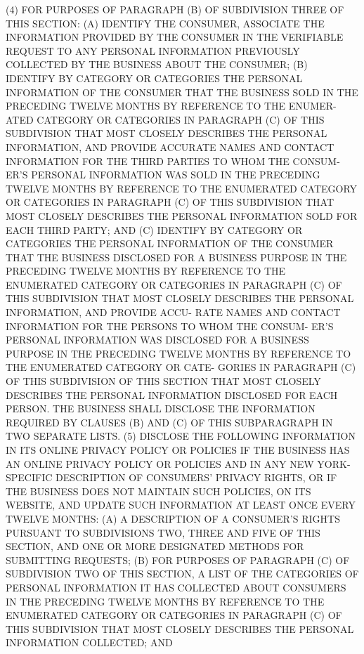    (4) FOR PURPOSES  OF  PARAGRAPH  (B)  OF  SUBDIVISION  THREE  OF  THIS
 SECTION:  (A)  IDENTIFY THE CONSUMER, ASSOCIATE THE INFORMATION PROVIDED
 BY THE CONSUMER IN THE VERIFIABLE REQUEST TO  ANY  PERSONAL  INFORMATION
 PREVIOUSLY COLLECTED BY THE BUSINESS ABOUT THE CONSUMER; (B) IDENTIFY BY
 CATEGORY OR CATEGORIES THE PERSONAL INFORMATION OF THE CONSUMER THAT THE
 BUSINESS SOLD IN THE PRECEDING TWELVE MONTHS BY REFERENCE TO THE ENUMER-
 ATED  CATEGORY  OR  CATEGORIES IN PARAGRAPH (C) OF THIS SUBDIVISION THAT
 MOST CLOSELY DESCRIBES THE PERSONAL INFORMATION,  AND  PROVIDE  ACCURATE
 NAMES  AND CONTACT INFORMATION FOR THE THIRD PARTIES TO WHOM THE CONSUM-
 ER'S PERSONAL INFORMATION WAS SOLD IN THE  PRECEDING  TWELVE  MONTHS  BY
 REFERENCE  TO  THE ENUMERATED CATEGORY OR CATEGORIES IN PARAGRAPH (C) OF
 THIS SUBDIVISION THAT MOST CLOSELY DESCRIBES  THE  PERSONAL  INFORMATION
 SOLD  FOR  EACH  THIRD PARTY; AND (C) IDENTIFY BY CATEGORY OR CATEGORIES
 THE PERSONAL INFORMATION OF THE CONSUMER THAT THE BUSINESS DISCLOSED FOR
 A BUSINESS PURPOSE IN THE PRECEDING TWELVE MONTHS BY  REFERENCE  TO  THE
 ENUMERATED  CATEGORY  OR CATEGORIES IN PARAGRAPH (C) OF THIS SUBDIVISION
 THAT MOST CLOSELY DESCRIBES THE PERSONAL INFORMATION, AND PROVIDE  ACCU-
 RATE  NAMES  AND CONTACT INFORMATION FOR THE PERSONS TO WHOM THE CONSUM-
 ER'S PERSONAL INFORMATION WAS DISCLOSED FOR A BUSINESS  PURPOSE  IN  THE
 PRECEDING TWELVE MONTHS BY REFERENCE TO THE ENUMERATED CATEGORY OR CATE-
 GORIES  IN  PARAGRAPH  (C) OF THIS SUBDIVISION OF THIS SECTION THAT MOST
 CLOSELY DESCRIBES THE PERSONAL INFORMATION DISCLOSED  FOR  EACH  PERSON.
 THE  BUSINESS SHALL DISCLOSE THE INFORMATION REQUIRED BY CLAUSES (B) AND
 (C) OF THIS SUBPARAGRAPH IN TWO SEPARATE LISTS.
   (5) DISCLOSE THE FOLLOWING INFORMATION IN ITS ONLINE PRIVACY POLICY OR
 POLICIES IF THE BUSINESS HAS AN ONLINE PRIVACY POLICY OR POLICIES AND IN
 ANY NEW YORK-SPECIFIC DESCRIPTION OF CONSUMERS' PRIVACY  RIGHTS,  OR  IF
 THE BUSINESS DOES NOT MAINTAIN SUCH POLICIES, ON ITS WEBSITE, AND UPDATE
 SUCH INFORMATION AT LEAST ONCE EVERY TWELVE MONTHS:
   (A) A DESCRIPTION OF A CONSUMER'S RIGHTS PURSUANT TO SUBDIVISIONS TWO,
 THREE  AND  FIVE OF THIS SECTION, AND ONE OR MORE DESIGNATED METHODS FOR
 SUBMITTING REQUESTS;
   (B) FOR PURPOSES OF PARAGRAPH (C) OF SUBDIVISION TWO OF THIS  SECTION,
 A  LIST OF THE CATEGORIES OF PERSONAL INFORMATION IT HAS COLLECTED ABOUT
 CONSUMERS IN THE PRECEDING TWELVE MONTHS BY REFERENCE TO THE  ENUMERATED
 CATEGORY  OR  CATEGORIES  IN PARAGRAPH (C) OF THIS SUBDIVISION THAT MOST
 CLOSELY DESCRIBES THE PERSONAL INFORMATION COLLECTED; AND
